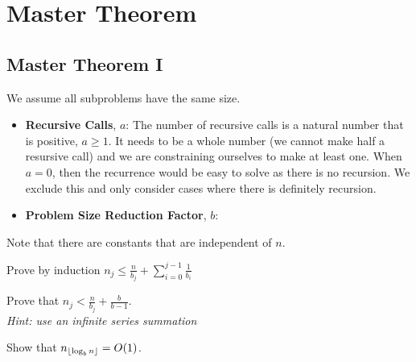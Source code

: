 
\chapter{Master Theorem}




\section{Master Theorem I}

We assume all subproblems have the same size. 

\begin{itemize}   
\renewcommand{\labelitemi}{$\Box$}
\item \textbf{Recursive Calls}, $a$:  
The number of recursive calls is a natural number that is positive, $a \geqslant 1$. 
It needs to be a whole number (we cannot make half a resursive call) and we are 
constraining ourselves to make at least one. When $a=0$, then the recurrence would be 
easy to solve as there is no recursion. We exclude this and only consider cases where 
there is definitely recursion. 
\item \textbf{Problem Size Reduction Factor}, $b$:  

\end{itemize}
Note that there are constants that are independent of $n$. 





\frmrule 

\begin{example}
Prove by induction $n_j \leqslant \frac{n}{b_j} + \sum^{j-1}_{i = 0}\frac{1}{b_i}$ 
\end{example}

\frmrule

\begin{example}
Prove that $n_j < \frac{n}{b_j} + \frac{b}{b-1}$. \\
\textit{Hint: use an infinite series summation}
\end{example}

\frmrule

\begin{example}
Show that $n_{\lfloor\log_b n \rfloor} = O(1)$.
\end{example}

\frmrule




